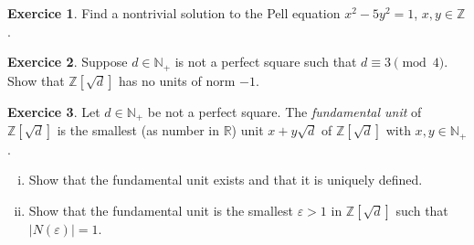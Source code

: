 \documentclass[12pt,a4paper]{article}
\theoremstyle{plain}
\newtheorem*{Sol*}{Solution}
\theoremstyle{definition}
\newtheorem{Ex}{Exercice}
\def \Q {\mathbb Q}
\def \Z {\mathbb Z}
\newif\ifsolutions
\newcommand{\exercise}[2]{
			\begin{Ex} #1 \end{Ex}
			\ifsolutions  \begin{Sol*} #2 \end{Sol*} \bigskip \else \bigskip  \fi
		}
\begin{document}
\exercise{Find a nontrivial  solution to the Pell equation $x^2 - 5 y^2 =1$, $x,y ∈ ℤ$.}{}

\exercise{Suppose $d ∈ℕ_+$ is not a perfect square such that $d ≡ 3 \pmod{4}$. Show that $ℤ[\sqrt{d}]$ has no units of norm $-1$. }
{
	If an element $x+y\sqrt{d} \in \Z[\sqrt{d}]$ has norm $-1$, then one has
		\[ x^2 + y^2 \equiv 3 \pmod{4}. \]
	Since squares have residue 0 or 1 mod 4, this equation admits no solution.
}


\exercise{Let $d ∈ ℕ_+$ be not a perfect square. The \emph{fundamental unit} of $ℤ[\sqrt{d}]$ is the smallest (as number in $ℝ$) unit $x + y \sqrt{d}$ of $ℤ[\sqrt{d}]$ with $x,y ∈ℕ_+$.

\bigskip 

\noindent
\begin{enumerate}[i)]
\item 
  Show that the fundamental unit exists and that it is uniquely defined.
\item Show that the fundamental unit is the smallest $ε>1$ in $ℤ[\sqrt{d}]$ such that $|N(ε)| =  1$. 
\end{enumerate}
}{
	\begin{enumerate}[i)]
		\item
		By exercise 1 of set 3, there exist infinitely many solutions of the equation $N(\alpha) = k, \alpha \in \Z[\sqrt{d}]$ for some integer $k < 1 + 2\sqrt{d}$.
			As such, there must exist two elements $\alpha, \beta \in \Z[\sqrt{d}]$ with coordinates in the basis $\{1, \sqrt{d}\}$ congruent mod $k$.

		One then verifies that $\frac1k \alpha \bar{\beta} \in \Z[\sqrt{d}]$, which concludes, since
			\[  N\left(\frac1k \alpha \bar{\beta}\right) \in \Z[\sqrt{d}] = \frac1{k^2} N(u) N(v) = 1. \]

		The uniqueness is then given by the fact that 1 and $\sqrt{d}$ are linearly independent over $\Q$.
		\item
		Let $\alpha = x + y\sqrt{d}$ be the fundamental unit of $\Z[\sqrt{d}]$. Clearly, $\alpha > 1$, since both $x$ and $y$ are positive.
		To conclude, it suffices to show that $\alpha$ is a unit if and only if $| N(\alpha) | = 1$.

		On one hand, if $\alpha$ is a unit, then $N(\alpha) N(\alpha^{-1}) = N(1) = 1$, which means that $N(\alpha)$ is a unit of $\Z$, ie. $\pm1$.

		On the other hand, if $N(\alpha)=1$, then $\alpha \bar{\alpha} = 1$, where $\bar{\alpha} = x - y \sqrt{d} \in \Z[\sqrt{d}]$.
	\end{enumerate}
}
\end{document}
